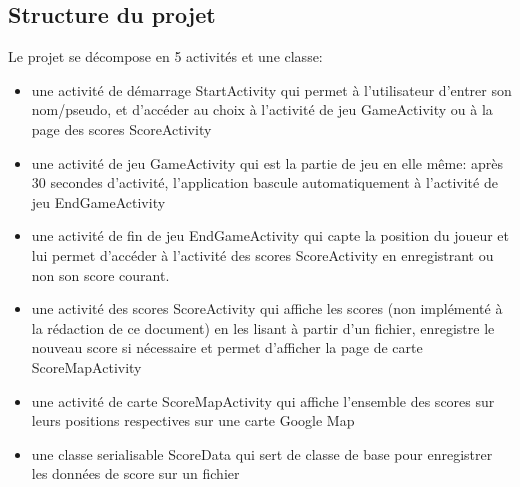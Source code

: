 \documentclass{article}
\begin{document}
\subsection{Structure du projet}
Le projet se décompose en 5 activités et une classe:
\begin{itemize}
\item une activité de démarrage StartActivity qui permet à l'utilisateur d'entrer son nom/pseudo, et d'accéder au choix à l'activité de jeu GameActivity ou à la page des scores ScoreActivity
\item une activité de jeu GameActivity qui est la partie de jeu en elle même: après 30 secondes d'activité, l'application bascule automatiquement à l'activité de jeu EndGameActivity
\item une activité de fin de jeu EndGameActivity qui capte la position du joueur et lui permet d'accéder à l'activité des scores ScoreActivity en enregistrant ou non son score courant.
\item une activité des scores ScoreActivity qui affiche les scores (non implémenté à la rédaction de ce document) en les lisant à partir d'un fichier, enregistre le nouveau score si nécessaire et permet d'afficher la page de carte ScoreMapActivity
\item une activité de carte ScoreMapActivity qui affiche l'ensemble des scores sur leurs positions respectives sur une carte Google Map
\item une classe serialisable ScoreData qui sert de classe de base pour enregistrer les données de score sur un fichier
\end{itemize}
\end{document}
